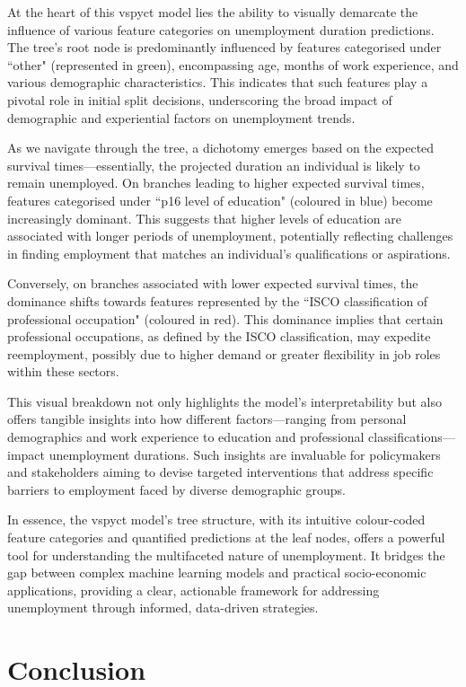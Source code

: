 \documentclass[3p,review,authoryear]{elsarticle}
\begin{document}
At the heart of this \gls{vspyct} model lies the ability to visually demarcate the influence of various feature categories on unemployment duration predictions.
The tree's root node is predominantly influenced by features categorised under ``other" (represented in green), encompassing age, months of work experience, and various demographic characteristics.
This indicates that such features play a pivotal role in initial split decisions, underscoring the broad impact of demographic and experiential factors on unemployment trends.

As we navigate through the tree, a dichotomy emerges based on the expected survival times—essentially, the projected duration an individual is likely to remain unemployed.
On branches leading to higher expected survival times, features categorised under ``p16 level of education" (coloured in blue) become increasingly dominant.
This suggests that higher levels of education are associated with longer periods of unemployment, potentially reflecting challenges in finding employment that matches an individual's qualifications or aspirations.

Conversely, on branches associated with lower expected survival times, the dominance shifts towards features represented by the ``ISCO classification of professional occupation" (coloured in red).
This dominance implies that certain professional occupations, as defined by the ISCO classification, may expedite reemployment, possibly due to higher demand or greater flexibility in job roles within these sectors.

This visual breakdown not only highlights the model's interpretability but also offers tangible insights into how different factors—ranging from personal demographics and work experience to education and professional classifications—impact unemployment durations.
Such insights are invaluable for policymakers and stakeholders aiming to devise targeted interventions that address specific barriers to employment faced by diverse demographic groups.

In essence, the \gls{vspyct} model's tree structure, with its intuitive colour-coded feature categories and quantified predictions at the leaf nodes, offers a powerful tool for understanding the multifaceted nature of unemployment.
It bridges the gap between complex machine learning models and practical socio-economic applications, providing a clear, actionable framework for addressing unemployment through informed, data-driven strategies.

\section{Conclusion}
\end{document}
